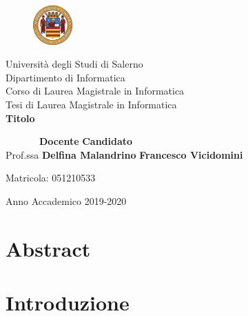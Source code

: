 \documentclass[14pt]{extreport}
\begin{document}
\begin{titlepage}
\begin{center}
	\begin{figure}
    	\includegraphics[width=1.5cm, height=1.5cm]{unisa.png}
    	\centering
    \end{figure}
	{\Large Università degli Studi di Salerno}\\[0.2truecm]
	{\large Dipartimento di Informatica\\Corso di Laurea Magistrale in Informatica}\\
	\hrulefill
	\vfill
	{\large Tesi di Laurea Magistrale in Informatica}\\[0.2truecm]
	\vfill\vfill
	{\LARGE {\bf Titolo}}
	
	\vfill\vfill
	
	
	\ \ \ \ \ \ \ {\bf Docente} \hfill {\bf Candidato}\ \ \\
	Prof.ssa \textbf{Delfina Malandrino} \hfill  \textbf{Francesco Vicidomini}
	\centerline{\hfill Matricola: 051210533}
	
	
	\vfill
	\hrulefill 
	\begin{center} Anno Accademico 2019-2020 \end{center}
	
\end{center}
\end{titlepage}

\setcounter{page}{1} 		

\newpage
	
\newcommand{\quotes}[1]{``#1''}
\tableofcontents
\listoffigures %
\listoftables %




\chapter*{Abstract}
 




\chapter{Introduzione}
\setcounter{page}{1} 		

\end{document}
